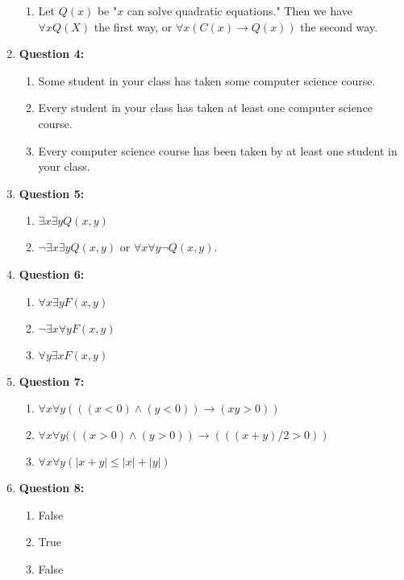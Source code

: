 \documentclass[11pt]{article}
\begin{document}
\begin{enumerate}
\begin{enumerate}[label=(\alph*)]
        \item Let $Q(x)$ be "$x$ can solve quadratic equations." Then we have $\forall xQ(X)$ the first way, or $\forall x(C(x)\rightarrow Q(x))$ the second way.
    \end{enumerate}
    \item \textbf{Question 4:}
    \begin{enumerate}[label=(\alph*)]
        \item Some student in your class has taken some computer science course.
        \item Every student in your class has taken at least one computer science course.
        \item Every computer science course has been taken by at least one student in your class.
    \end{enumerate}
    \item \textbf{Question 5:}
    \begin{enumerate}[label=(\alph*)]
        \item $\exists x\exists yQ(x,y)$
        \item $\lnot\exists x\exists yQ(x,y)$ or $\forall x\forall y\lnot Q(x,y)$.
    \end{enumerate}
    \item \textbf{Question 6:}
    \begin{enumerate}[label=(\alph*)]
        \item $\forall x\exists yF(x,y)$
        \item $\lnot\exists x\forall yF(x,y)$
        \item $\forall y\exists xF(x,y)$
    \end{enumerate}
    \item \textbf{Question 7:}
    \begin{enumerate}[label=(\alph*)]
        \item $\forall x\forall y(((x<0)\land(y<0))\rightarrow(xy>0))$
        \item $\forall x\forall y(((x>0)\land(y>0))\rightarrow(((x+y)/2>0))$
        \item $\forall x\forall y(|x+y|\leq|x|+|y|)$
    \end{enumerate}
    \item \textbf{Question 8:}
    \begin{enumerate}[label=(\alph*)]
        \item False
        \item True
        \item False
    \end{enumerate}
\end{enumerate}
\end{document}
